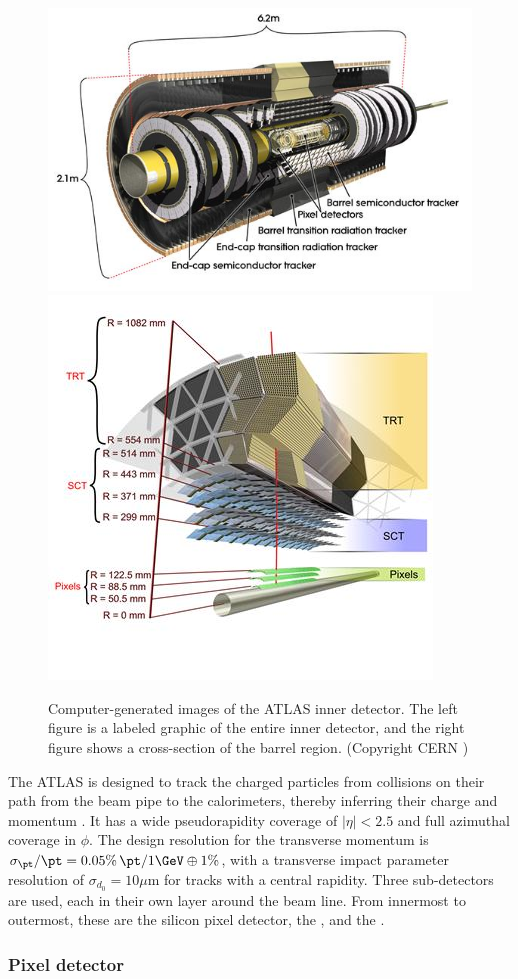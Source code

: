 \begin{figure}[t]
\includegraphics[width=0.57\linewidth]{id_whole.jpg}
\includegraphics[width=0.42\linewidth]{id_slice.jpg}
\caption{Computer-generated images of the ATLAS inner detector. The left figure is a labeled graphic of the entire inner detector, and the right figure shows a cross-section of the barrel region. (Copyright CERN \cite{Pequenao:1095926})}
\label{fig:atlas_id}
\end{figure}

The ATLAS \id is designed to track the charged particles from collisions on their path from the beam pipe to the calorimeters, thereby inferring their charge and momentum \cite{ATLAS:1997ag,ATLAS:1997af,Aad:2010bx}.
It has a wide pseudorapidity coverage of \(\left| \eta \right| < 2.5\) and full azimuthal coverage in $\phi$.
The design resolution for the transverse momentum is \( \sigma_{\pt}/\pt = 0.05\% \, \pt /1 \GeV \oplus 1\% \), with a transverse impact parameter resolution of \( \sigma_{d_0} = 10 \mu\textrm{m}\) for tracks with a central rapidity.
Three sub-detectors are used, each in their own layer around the beam line.
From innermost to outermost, these are the silicon pixel detector, the \sct, and the \trt.


\subsubsection{Pixel detector}

